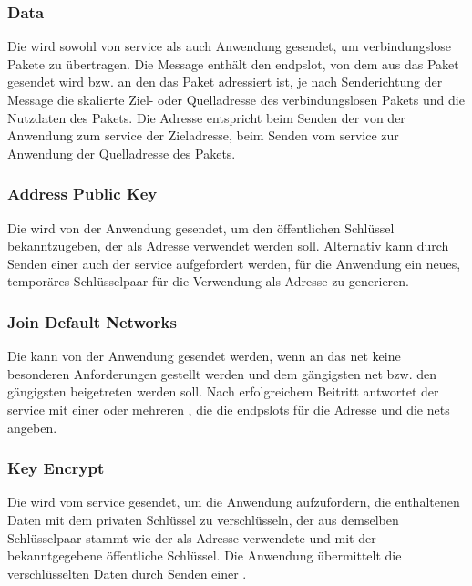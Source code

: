 \asprotoslotassignbytefield


\subsubsection{Data}
\label{dcl-asproto-data}
Die \msg{\asprotodata} wird sowohl von \gls{service} als auch Anwendung
gesendet, um verbindungslose Pakete zu übertragen.
Die Message enthält den \gls{endpslot}, von dem aus das Paket gesendet wird
bzw. an den das Paket adressiert ist, je nach Senderichtung der Message die
skalierte Ziel- oder Quelladresse des verbindungslosen Pakets und die Nutzdaten
des Pakets.
Die Adresse entspricht beim Senden der \msg{\asprotodata} von der Anwendung zum
\gls{service} der Zieladresse, beim Senden vom \gls{service} zur Anwendung der
Quelladresse des Pakets.

\asprotodatabytefield


\subsubsection{Address Public Key}
\label{dcl-asproto-addrpubkey}
Die \msg{\asprotoaddrpubkey} wird von der Anwendung gesendet, um den
öffentlichen Schlüssel bekanntzugeben, der als Adresse verwendet werden soll.
Alternativ kann durch Senden einer \msg{\asprotogenkey} auch der \gls{service}
aufgefordert werden, für die Anwendung ein neues, temporäres Schlüsselpaar für
die Verwendung als Adresse zu generieren.

\asprotoaddrpubkeybytefield


\subsubsection{Join Default Networks}
\label{dcl-asproto-joindefnets}
Die \msg{\asprotojoindefnets} kann von der Anwendung gesendet werden, wenn
an das \gls{net} keine besonderen Anforderungen gestellt werden und dem
gängigsten \gls{net} bzw. den gängigsten  beigetreten
werden soll.
Nach erfolgreichem Beitritt antwortet der \gls{service} mit einer oder mehreren
\msgpl{\asprotoslotassign}, die die \glspl{endpslot} für die Adresse und die
\glspl{net} angeben.

\asprotojoindefnetsbytefield


\subsubsection{Key Encrypt}
\label{dcl-asproto-keyenc}
Die \msg{\asprotokeyenc} wird vom \gls{service} gesendet, um die Anwendung
aufzufordern, die enthaltenen Daten mit dem privaten Schlüssel zu verschlüsseln,
der aus demselben Schlüsselpaar stammt wie der als Adresse verwendete und mit
der \msg{\asprotoaddrpubkey} bekanntgegebene öffentliche Schlüssel.
Die Anwendung übermittelt die verschlüsselten Daten durch Senden einer
\msg{\asprotocryptoresponse}.

